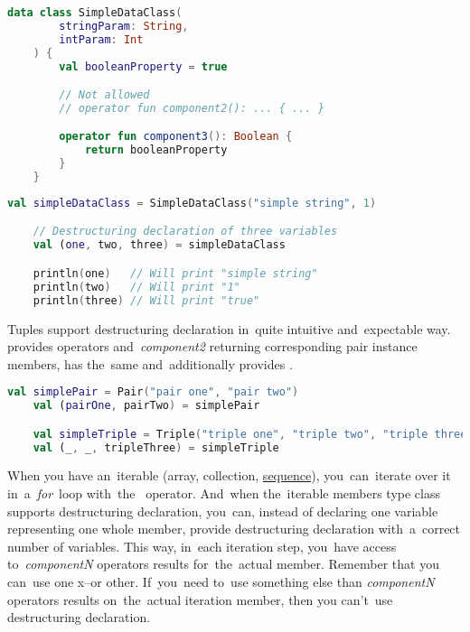 \begin{lstlisting}[language=Kotlin, title={Data class with two parameters in the primary constructor and additional \mbit{component3}}]
    data class SimpleDataClass(
        stringParam: String,
        intParam: Int
    ) {
        val booleanProperty = true

        // Not allowed
        // operator fun component2(): ... { ... }

        operator fun component3(): Boolean {
            return booleanProperty
        }
    }
\end{lstlisting}

\begin{lstlisting}[language=Kotlin, title={Destructuring declaration behavior}]
    val simpleDataClass = SimpleDataClass("simple string", 1)

    // Destructuring declaration of three variables
    val (one, two, three) = simpleDataClass

    println(one)   // Will print "simple string"
    println(two)   // Will print "1"
    println(three) // Will print "true"
\end{lstlisting}

Tuples support destructuring declaration in~quite intuitive and~expectable way.
 provides operators  \mbox{and \textit{component2}} returning corresponding pair instance members,  has the~same and~additionally provides .

\begin{lstlisting}[language=Kotlin]
    val simplePair = Pair("pair one", "pair two")
    val (pairOne, pairTwo) = simplePair

    val simpleTriple = Triple("triple one", "triple two", "triple three")
    val (_, _, tripleThree) = simpleTriple
\end{lstlisting}

\label{kotlindestdeclforloop}
When you have an~iterable (array, collection, \hyperref[kotlinsequence]{sequence}), you~can~iterate over it \mbox{in a \textit{for} loop} \mbox{with the } operator.
And~when the~iterable members type class supports destructuring declaration, you~can, instead of declaring one variable representing one whole member, provide destructuring declaration with~a~correct number of variables.
This way, in~each iteration step, you~have access \mbox{to \textit{componentN}} operators results for~the~actual member.
Remember that you can~use one x--or other.
If~you~need to~use something else than \textit{componentN} operators results on~the~actual iteration member, then you can't~use destructuring declaration.

